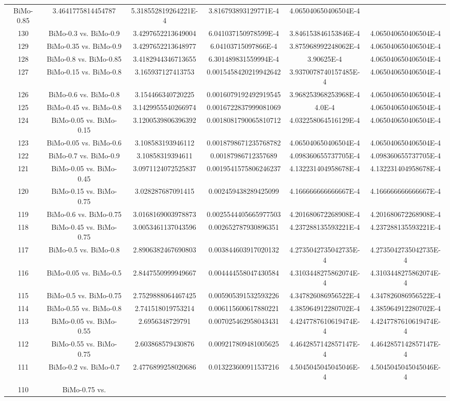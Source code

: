 \documentclass[a4paper,10pt]{article}
\begin{document}
\begin{landscape}
\begin{table}[!htp]
\begin{tabular}{cccccc}
BiMo-0.85&3.4641775814454787&5.318552819264221E-4&3.816793893129771E-4&4.065040650406504E-4\\130&BiMo-0.3 vs. BiMo-0.9&3.4297652213649004&6.041037150978599E-4&3.846153846153846E-4&4.065040650406504E-4\\129&BiMo-0.35 vs. BiMo-0.9&3.4297652213648977&6.04103715097866E-4&3.875968992248062E-4&4.065040650406504E-4\\128&BiMo-0.8 vs. BiMo-0.85&3.4182944346713655&6.301489831559994E-4&3.90625E-4&4.065040650406504E-4\\127&BiMo-0.15 vs. BiMo-0.8&3.165937127413753&0.0015458420219942642&3.9370078740157485E-4&4.065040650406504E-4\\126&BiMo-0.6 vs. BiMo-0.8&3.154466340720225&0.0016079192492919545&3.968253968253968E-4&4.065040650406504E-4\\125&BiMo-0.45 vs. BiMo-0.8&3.1429955540266974&0.0016722837999081069&4.0E-4&4.065040650406504E-4\\124&BiMo-0.05 vs. BiMo-0.15&3.1200539806396392&0.0018081790065810712&4.032258064516129E-4&4.065040650406504E-4\\123&BiMo-0.05 vs. BiMo-0.6&3.108583193946112&0.0018798671235768782&4.065040650406504E-4&4.065040650406504E-4\\122&BiMo-0.7 vs. BiMo-0.9&3.10858319394611&0.00187986712357689&4.098360655737705E-4&4.098360655737705E-4\\121&BiMo-0.05 vs. BiMo-0.45&3.0971124072525837&0.0019541575806246237&4.132231404958678E-4&4.132231404958678E-4\\120&BiMo-0.15 vs. BiMo-0.75&3.028287687091415&0.002459438289425099&4.166666666666667E-4&4.166666666666667E-4\\119&BiMo-0.6 vs. BiMo-0.75&3.0168169003978873&0.0025544405665977503&4.201680672268908E-4&4.201680672268908E-4\\118&BiMo-0.45 vs. BiMo-0.75&3.0053461137043596&0.002652787930896351&4.237288135593221E-4&4.237288135593221E-4\\117&BiMo-0.5 vs. BiMo-0.8&2.8906382467690803&0.003844603917020132&4.2735042735042735E-4&4.2735042735042735E-4\\116&BiMo-0.05 vs. BiMo-0.5&2.8447550999949667&0.004444558047430584&4.3103448275862074E-4&4.3103448275862074E-4\\115&BiMo-0.5 vs. BiMo-0.75&2.7529888064467425&0.005905391532593226&4.347826086956522E-4&4.347826086956522E-4\\114&BiMo-0.55 vs. BiMo-0.8&2.741518019753214&0.006115600617880221&4.385964912280702E-4&4.385964912280702E-4\\113&BiMo-0.05 vs. BiMo-0.55&2.6956348729791&0.007025462958043431&4.4247787610619474E-4&4.4247787610619474E-4\\112&BiMo-0.55 vs. BiMo-0.75&2.603868579430876&0.009217809481005625&4.4642857142857147E-4&4.4642857142857147E-4\\111&BiMo-0.2 vs. BiMo-0.7&2.4776899258020686&0.013223600911537216&4.5045045045045046E-4&4.5045045045045046E-4\\110&BiMo-0.75 vs. 
\end{tabular}
\end{table}
\end{landscape}
\end{document}
